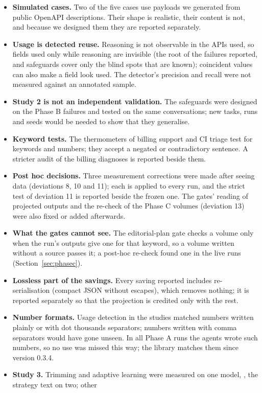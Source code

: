 \begin{itemize}
  on two cases only.
\item \textbf{Simulated cases.} Two of the five cases use payloads we generated from public OpenAPI descriptions.
  Their shape is realistic, their content is not, and because we designed them they are reported separately.
\item \textbf{Usage is detected reuse.} Reasoning is not observable in the APIs used, so fields used only while
  reasoning are invisible (the root of the failures reported, and safeguards cover only the blind spots that are
  known); coincident values can also make a field look used. The detector's precision and recall were not measured
  against an annotated sample.
\item \textbf{Study 2 is not an independent validation.} The safeguards were designed on the Phase B failures and
  tested on the same conversations; new tasks, runs and seeds would be needed to show that they generalise.
\item \textbf{Keyword tests.} The thermometers of billing support and CI triage test for keywords and numbers; they
  accept a negated or contradictory sentence. A stricter audit of the billing diagnoses is reported beside them.
\item \textbf{Post hoc decisions.} Three measurement corrections were made after seeing data (deviations 8, 10 and
  11); each is applied to every run, and the strict test of deviation 11 is reported beside the frozen one. The
  gates' reading of projected outputs and the re-check of the Phase C volumes (deviation 13) were also fixed or added
  afterwards.
\item \textbf{What the gates cannot see.} The editorial-plan gate checks a volume only when the run's outputs give
  one for that keyword, so a volume written without a source passes it; a post-hoc re-check found one in the live
  runs (Section~\ref{sec:phasec}).
\item \textbf{Lossless part of the savings.} Every saving reported includes re-serialisation (compact JSON without
  escapes), which removes nothing; it is reported separately so that the projection is credited only with the rest.
\item \textbf{Number formats.} Usage detection in the studies matched numbers written plainly or with dot thousands
  separators; numbers written with comma separators would have gone unseen. In all Phase A runs the agents wrote
  \CommaNumbersWritten{} such numbers, so no use was missed this way; the library matches them since version 0.3.4.
\item \textbf{Study 3.} Trimming and adaptive learning were measured on one model, \texttt{\SthreeModelA}, the strategy text on two; other

\end{itemize}
